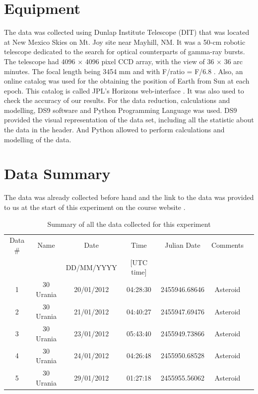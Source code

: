 \documentclass[a4paper,12pt]{article}
\begin{document}
\section{Equipment}
\label{sec:equipment} 
The data was collected using Dunlap Institute Telescope (DIT) that was located at New Mexico Skies on Mt. Joy site near Mayhill, NM. It was a 50-cm robotic telescope dedicated to the search for optical counterparts of gamma-ray bursts. The telescope had 4096 $\times$ 4096 pixel CCD array, with the view of 36 $\times$ 36 arc minutes. The focal length being 3454 mm and with F/ratio = F/6.8 \cite{instructions}. Also, an online catalog was used for the obtaining the position of Earth from Sun at each epoch. This catalog is called JPL's Horizons web-interface \cite{jpl}. It was also used to check the accuracy of our results. For the data reduction, calculations and modelling, DS9 software and Python Programming Language was used. DS9 provided the visual representation of the data set, including all the statistic about the data in the header. And Python allowed to perform calculations and modelling of the data. 

\section{Data Summary}
\label{sec:data}

The data was already collected before hand and the link to the data was provided to us at the start of this experiment on the course website \cite{instructions}. 


\begin{table}[H]
\centering %
\caption{Summary of all the data collected for this experiment}
\footnotesize

\begin{tabular}{ccccccc}%
\hline
\hline
Data \# & Name & Date & Time & Julian Date &Comments \\
& &  DD/MM/YYYY&[UTC time]&&\\
\hline
\hline
1   &   30 Urania    & 20/01/2012   &04:28:30&2455946.68646& Asteroid\\
2   &   30 Urania     &  21/01/2012   &04:40:27&2455947.69476&Asteroid \\
3   &    30 Urania   &23/01/2012    &05:43:40 &2455949.73866&Asteroid \\
4   &   30 Urania    & 24/01/2012    &04:26:48&2455950.68528& Asteroid\\
5   &  30 Urania  &  29/01/2012   &01:27:18 &2455955.56062&Asteroid \\
\hline
\hline

\end{tabular}
\label{table:dataset} %
\end{table}
\end{document}
